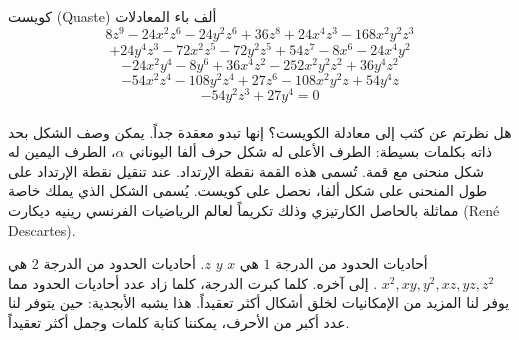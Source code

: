 \begin{surferPage}[ويست]{كويست (Quaste)}
ألف باء المعادلات
  \smallskip
\[8z^9-24x^2z^6-24y^2z^6+36z^8+24x^4z^3-168x^2y^2z^3\]
\[+24y^4z^3-72x^2z^5-72y^2z^5+54z^7-8x^6-24x^4y^2\]
\[-24x^2y^4-8y^6 + 36x^4z^2-252x^2y^2z^2+36y^4z^2\]
\[- 54x^2z^4-108y^2z^4 + 27z^6-108x^2y^2z + 54y^4z\]
\[-54y^2z^3 + 27y^4 = 0\]\\
\vspace{0.3cm}
هل نظرتم عن كثب إلى معادلة الكويست؟ إنها تبدو معقدة جداً.
يمكن وصف الشكل بحد ذاته بكلمات بسيطة: الطرف الأعلى له شكل حرف ألفا اليوناني $\alpha$، الطرف اليمين له شكل منحنى مع قمة. تُسمى هذه القمة نقطة الإرتداد. عند تنقيل نقطة الإرتداد على طول المنحنى على شكل ألفا، نحصل على كويست. يُسمى الشكل الذي يملك خاصة مماثلة  بالحاصل الكارتيزي وذلك تكريماً لعالم الرياضيات الفرنسي رينيه ديكارت \textenglish{(Ren\'e Descartes)}.

\vspace{0.3cm}
أحاديات الحدود من الدرجة $1$ هي $x$ $y$  $z$. أحاديات الحدود من الدرجة $2$ هي
 $x^2, xy, y^2, xz, yz, z^2$  
. إلى آخره. كلما كبرت الدرجة، كلما زاد عدد أحاديات الحدود مما يوفر لنا المزيد من الإمكانيات لخلق أشكال أكثر تعقيداً. هذا يشبه الأبجدية: حين يتوفر لنا عدد أكبر من الأحرف، يمكننا كتابة كلمات وجمل أكثر تعقيداً.
\end{surferPage}
